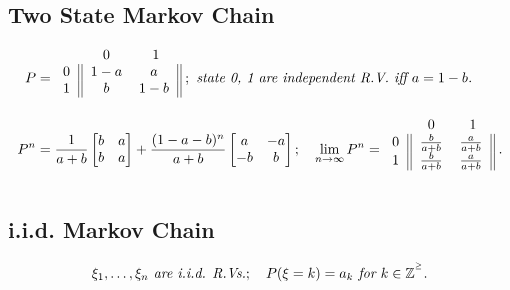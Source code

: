 \documentclass{article}
\begin{document}
\subsection{Two State Markov Chain}
\begin{align*}
    P & = 
        \begin{blockarray}{ccc}
            & 0 & 1 \\
            \begin{block}{c||cc||}
                0 & 1-a & a \\
                1 & b & 1-b \\
            \end{block}
        \end{blockarray}\; ; \emph{ state 0, 1 are independent R.V. iff $a=1-b$.}\\
        P^n & = \frac{1}{a+b}
        \begin{bmatrix}
            b & a \\
            b & a \\
        \end{bmatrix} + 
        \frac{(1-a-b)^n}{a+b}
        \begin{bmatrix}
            a & -a \\
            -b & b \\
        \end{bmatrix} ; \quad
        \lim_{n\rightarrow\infty}P^n = 
            \begin{blockarray}{ccc}
                & 0 & 1 \\
                \begin{block}{c||cc||}
                    0 & \frac{b}{a+b} & \frac{a}{a+b} \\
                    1 & \frac{b}{a+b} & \frac{a}{a+b} \\
                \end{block}
            \end{blockarray}\; .
\end{align*} 

\subsection{i.i.d. Markov Chain}
\begin{align*}
    \xi_1, \dots, \xi_n \emph{ are i.i.d. R.Vs.}; \quad P(\xi = k) = a_k \emph{ for } k\in\mathbb{Z^{^\ge}}.
\end{align*}
\end{document}
